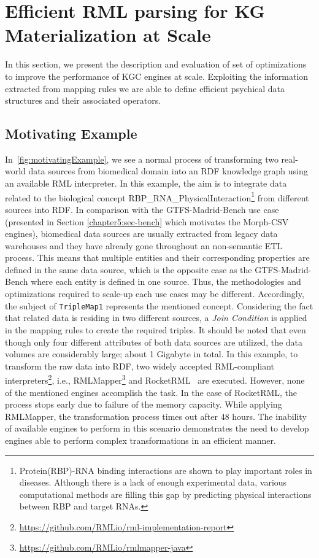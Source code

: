 \section{Efficient RML parsing for KG Materialization at Scale}
\label{chap7_rdfizer}
In this section, we present the description and evaluation of set of optimizations to improve the performance of KGC engines at scale. Exploiting the information extracted from mapping rules we are able to define efficient psychical data structures and their associated operators.

\subsection{Motivating Example}
In~\autoref{fig:motivatingExample}, we see a normal process of transforming two real-world data sources from biomedical domain into an RDF knowledge graph using an available RML interpreter. In this example, the aim is to integrate data related to the biological concept RBP\_RNA\_PhysicalInteraction\footnote{Protein(RBP)-RNA binding interactions are shown to play important roles in diseases. Although there is a lack of enough experimental data, various computational methods are filling this gap by predicting physical interactions between RBP and target RNAs.} from different sources into RDF. In comparison with the GTFS-Madrid-Bench use case (presented in Section \ref{chapter5:sec-bench} which motivates the Morph-CSV engines), biomedical data sources are usually extracted from legacy data warehouses and they have already gone throughout an non-semantic ETL process. This means that multiple entities and their corresponding properties are defined in the same data source, which is the opposite case as the GTFS-Madrid-Bench where each entity is defined in one source. Thus, the methodologies and optimizations required to scale-up each use cases may be different. Accordingly, the subject of \texttt{TripleMap1} represents the mentioned concept. Considering the fact that related data is residing in two different sources, a \textit{Join Condition} is applied in the mapping rules to create the required triples. It should be noted that even though only four different attributes of both data sources are utilized, the data volumes are considerably large; about 1 Gigabyte in total. In this example, to transform the raw data into RDF, two widely accepted RML-compliant interpreters\footnote{\url{https://github.com/RMLio/rml-implementation-report}}, i.e., RMLMapper\footnote{\url{https://github.com/RMLio/rmlmapper-java}} and RocketRML~\citep{csimcsek2019rocketrml} are executed. However, none of the mentioned engines accomplish the task. In the case of RocketRML, the process stops early due to failure of the memory capacity. While applying RMLMapper, the transformation process times out after 48 hours. The inability of available engines to perform in this scenario demonstrates the need to develop engines able to perform complex transformations in an efficient manner.

